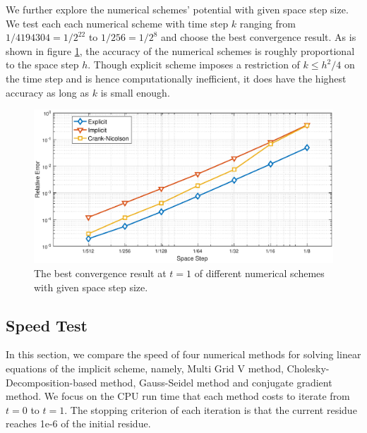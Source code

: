 \documentclass[12pt]{article}
\begin{document}
We further explore the numerical schemes' potential with given space step size. We test each each numerical scheme with time step $k$ ranging from $1/4194304 = 1/2^{22}$ to $1/256 = 1/2^8$ and choose the best convergence result. As is shown in figure \ref{figure:plot}, the accuracy of the numerical schemes is roughly proportional to the space step $h$. Though explicit scheme imposes a restriction of $k \le h^2/4$ on the time step and is hence computationally
inefficient, it does have the highest accuracy as long as $k$ is small enough.
\begin{figure}[!htb]
\centerline{
	\includegraphics[width =20cm]{plot.eps}
}
\caption{The best convergence result at $t = 1$ of different numerical schemes with given space step size.}
\label{figure:plot}
\end{figure}

\subsection{Speed Test}
In this section, we compare the speed of four numerical methods for solving linear equations of the implicit scheme, namely, Multi Grid V method, Cholesky-Decomposition-based method, Gauss-Seidel method and conjugate gradient method. We focus on the CPU run time that each method costs to iterate from $t = 0$ to $t = 1$. The stopping criterion of each iteration is that the current residue reaches 1e-6 of the initial residue. 
\end{document}
